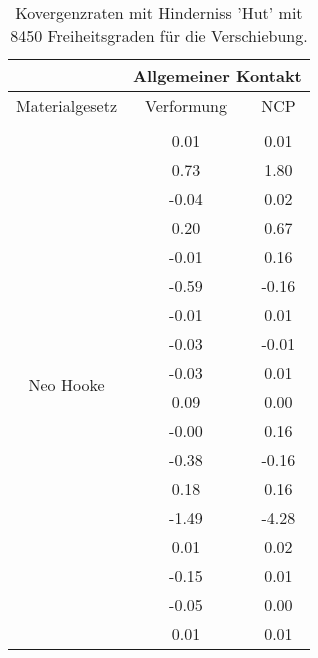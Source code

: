 \begin{table} 
\centering 
\begin{tabular}{c|cc|} 
\cline{2-3} 
 & \multicolumn{2}{|c|}{Allgemeiner Kontakt} \\ 
\hline 
\multicolumn{1}{|c|}{Materialgesetz} & \multicolumn{1}{c|}{Verformung} & \multicolumn{1}{c|}{NCP} \\ 
\hline 
\multicolumn{1}{|c|}{\multirow{19}{*}{Neo Hooke}} &\multicolumn{1}{|c|}{} & \multicolumn{1}{|c|}{} \\ 
\multicolumn{1}{|c|}{} & \multicolumn{1}{|c|}{      0.01} & \multicolumn{1}{|c|}{      0.01} \\ 
\multicolumn{1}{|c|}{} & \multicolumn{1}{|c|}{      0.73} & \multicolumn{1}{|c|}{      1.80} \\ 
\multicolumn{1}{|c|}{} & \multicolumn{1}{|c|}{     -0.04} & \multicolumn{1}{|c|}{      0.02} \\ 
\multicolumn{1}{|c|}{} & \multicolumn{1}{|c|}{      0.20} & \multicolumn{1}{|c|}{      0.67} \\ 
\multicolumn{1}{|c|}{} & \multicolumn{1}{|c|}{     -0.01} & \multicolumn{1}{|c|}{      0.16} \\ 
\multicolumn{1}{|c|}{} & \multicolumn{1}{|c|}{     -0.59} & \multicolumn{1}{|c|}{     -0.16} \\ 
\multicolumn{1}{|c|}{} & \multicolumn{1}{|c|}{     -0.01} & \multicolumn{1}{|c|}{      0.01} \\ 
\multicolumn{1}{|c|}{} & \multicolumn{1}{|c|}{     -0.03} & \multicolumn{1}{|c|}{     -0.01} \\ 
\multicolumn{1}{|c|}{} & \multicolumn{1}{|c|}{     -0.03} & \multicolumn{1}{|c|}{      0.01} \\ 
\multicolumn{1}{|c|}{} & \multicolumn{1}{|c|}{      0.09} & \multicolumn{1}{|c|}{      0.00} \\ 
\multicolumn{1}{|c|}{} & \multicolumn{1}{|c|}{     -0.00} & \multicolumn{1}{|c|}{      0.16} \\ 
\multicolumn{1}{|c|}{} & \multicolumn{1}{|c|}{     -0.38} & \multicolumn{1}{|c|}{     -0.16} \\ 
\multicolumn{1}{|c|}{} & \multicolumn{1}{|c|}{      0.18} & \multicolumn{1}{|c|}{      0.16} \\ 
\multicolumn{1}{|c|}{} & \multicolumn{1}{|c|}{     -1.49} & \multicolumn{1}{|c|}{     -4.28} \\ 
\multicolumn{1}{|c|}{} & \multicolumn{1}{|c|}{      0.01} & \multicolumn{1}{|c|}{      0.02} \\ 
\multicolumn{1}{|c|}{} & \multicolumn{1}{|c|}{     -0.15} & \multicolumn{1}{|c|}{      0.01} \\ 
\multicolumn{1}{|c|}{} & \multicolumn{1}{|c|}{     -0.05} & \multicolumn{1}{|c|}{      0.00} \\ 
\multicolumn{1}{|c|}{} & \multicolumn{1}{|c|}{      0.01} & \multicolumn{1}{|c|}{      0.01} \\ 
\hline 
\end{tabular}\caption{Kovergenzraten mit Hinderniss 'Hut' mit 8450 Freiheitsgraden für die Verschiebung.}\label{tab:Rate_Hut_level5}
\end{table} 
